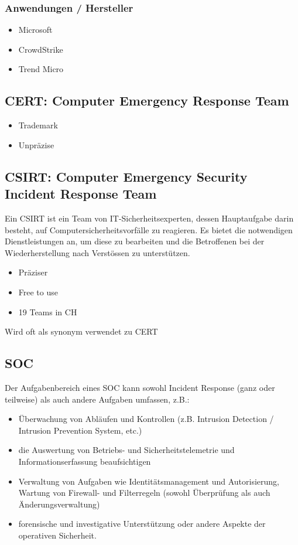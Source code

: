 \subsubsection{Anwendungen / Hersteller}
\begin{itemize}
    \item Microsoft
    \item CrowdStrike
    \item Trend Micro
\end{itemize}


\subsection{CERT: Computer Emergency Response Team}
\begin{itemize}
    \item Trademark
    \item Unpräzise
\end{itemize}

\subsection{CSIRT: Computer Emergency Security Incident Response Team}\label{subsec:csirt}
Ein CSIRT ist ein Team von IT-Sicherheitsexperten, dessen Hauptaufgabe darin besteht, auf Computersicherheitsvorfälle zu reagieren. Es bietet die notwendigen Dienstleistungen an, um diese zu bearbeiten und die Betroffenen bei der Wiederherstellung nach Verstössen zu unterstützen.

\begin{itemize}
    \item Präziser
    \item Free to use
    \item 19 Teams in CH
\end{itemize}
 Wird oft als synonym verwendet zu CERT

\subsection{SOC}\label{subsec:soc}
Der Aufgabenbereich eines SOC kann sowohl Incident Response (ganz oder teilweise) als auch andere Aufgaben umfassen, z.B.:

\begin{itemize}
    \item Überwachung von Abläufen und Kontrollen (z.B. Intrusion Detection / Intrusion Prevention System, etc.)
    \item die Auswertung von Betriebs- und Sicherheitstelemetrie und Informationserfassung beaufsichtigen
    \item Verwaltung von Aufgaben wie Identitätsmanagement und Autorisierung, Wartung von Firewall- und Filterregeln (sowohl Überprüfung als auch Änderungsverwaltung)
    \item forensische und investigative Unterstützung oder andere Aspekte der operativen Sicherheit.
\end{itemize}

